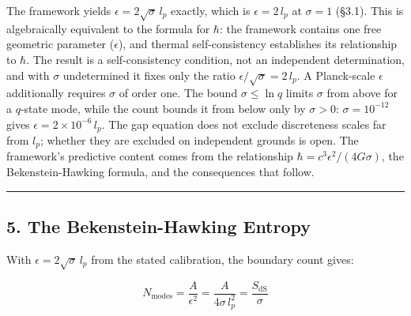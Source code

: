 \documentclass[
]{article}
\begin{document}
The framework yields \(\epsilon = 2\sqrt{\sigma}\,l_p\) exactly, which
is \(\epsilon = 2\,l_p\) at \(\sigma = 1\) (§3.1). This is algebraically
equivalent to the formula for \(\hbar\): the framework contains one free
geometric parameter (\(\epsilon\)), and thermal self-consistency
establishes its relationship to \(\hbar\). The result is a
self-consistency condition, not an independent determination, and with
\(\sigma\) undetermined it fixes only the ratio
\(\epsilon/\sqrt{\sigma} = 2\,l_p\). A Planck-scale \(\epsilon\)
additionally requires \(\sigma\) of order one. The bound
\(\sigma \leq \ln q\) limits \(\sigma\) from above for a \(q\)-state
mode, while the count bounds it from below only by \(\sigma > 0\):
\(\sigma = 10^{-12}\) gives \(\epsilon = 2 \times 10^{-6}\,l_p\). The
gap equation does not exclude discreteness scales far from \(l_p\);
whether they are excluded on independent grounds is open. The
framework's predictive content comes from the relationship
\(\hbar = c^3 \epsilon^2/(4G\sigma)\), the Bekenstein-Hawking formula,
and the consequences that follow.

\begin{center}\rule{0.5\linewidth}{0.5pt}\end{center}

\hypertarget{the-bekenstein-hawking-entropy}{%
\subsection{5. The Bekenstein-Hawking
Entropy}\label{the-bekenstein-hawking-entropy}}

With \(\epsilon=2\sqrt{\sigma}\,l_p\) from the stated calibration, the
boundary count gives:

\[N_{\text{modes}} = \frac{A}{\epsilon^2} = \frac{A}{4\sigma\,l_p^2} = \frac{S_{\text{dS}}}{\sigma}\]
\end{document}
